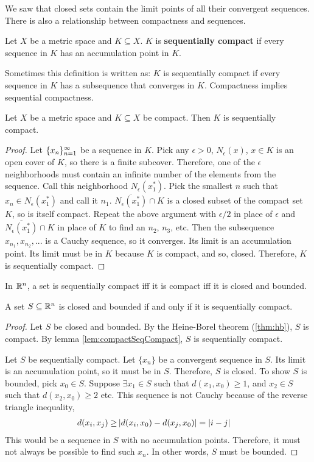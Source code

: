 We saw that closed sets contain the limit points of all their
convergent sequences. There is also a relationship between compactness
and sequences. 
\begin{definition}
  Let $X$ be a metric space and $K \subseteq X$. $K$ is
  \textbf{sequentially compact} if every sequence in $K$ has an
  accumulation point in $K$.
\end{definition}
Sometimes this definition is written as: $K$ is sequentially compact
if every sequence in $K$ has a subsequence that converges in
$K$. Compactness implies sequential compactness. 
\begin{lemma}\label{lem:compactSeqCompact}
    Let $X$ be a metric space and $K \subseteq X$ be compact. Then $K$
    is sequentially compact. 
\end{lemma}
\begin{proof}
  Let $\{{x}_n \}_{n=1}^\infty$ be a sequence in
  $K$. Pick any $\epsilon>0$, $N_\epsilon(x)$, $x \in K$ is an open
  cover of $K$, so there is a finite subcover. Therefore, one of the
  $\epsilon$ neighborhoods must contain an infinite number of the
  elements from the sequence. Call this neighborhood
  $N_\epsilon(x_1^\ast)$. Pick the smallest $n$ such that $x_n \in
  N_\epsilon(x_1^\ast)$ and call it $n_1$. $\overline{N_{\epsilon}(x_1^\ast)}
  \cap K$ is a closed subset of the compact set $K$, so is itself
  compact. Repeat the above argument with $\epsilon/2$ in place of
  $\epsilon$ and $\overline{N_{\epsilon}(x_1^\ast)} \cap K$ in place of $K$
  to find an $n_2$, $n_3$, etc. Then the subsequence $x_{n_1},
  x_{n_2}, ...$ is a Cauchy sequence, so it converges. Its limit is an
  accumulation point. Its limit must be in $K$ because $K$ is compact,
  and so, closed. Therefore, $K$ is sequentially compact.
\end{proof}

In $\mathbb{R}^n$, a set is sequentially compact iff it is compact iff it is
closed and bounded.
\begin{theorem} \label{thm:bw}
  A set $S \subseteq \mathbb{R}^n$ is closed and bounded if and only if it is
  sequentially compact. 
\end{theorem}
\begin{proof}
  Let $S$ be closed and bounded. By the Heine-Borel theorem
  (\ref{thm:hb}), $S$ is compact. By lemma
  \ref{lem:compactSeqCompact}, $S$ is sequentially compact. 

  Let $S$ be sequentially compact. Let $\{x_n\}$ be a convergent
  sequence in $S$. Its limit is an accumulation point, so it must be
  in $S$. Therefore, $S$ is closed. To show $S$ is bounded, pick $x_0
  \in S$. Suppose $\exists x_1 \in S$ such that $d(x_1, x_0) \geq 1$,
  and $x_2 \in S$ such that $d(x_2, x_0) \geq 2$ etc. This sequence is
  not Cauchy because of the reverse triangle inequality,  
  \begin{align*}
    d(x_i,x_j) \geq & \left\vert {d(x_i,x_0) - d(x_j,x_0) } \right\vert = |i-j|
  \end{align*}  
  This would be a sequence in $S$ with no accumulation
  points. Therefore, it must not always be possible to find such
  $x_n$. In other words, $S$ must be bounded.
\end{proof}

